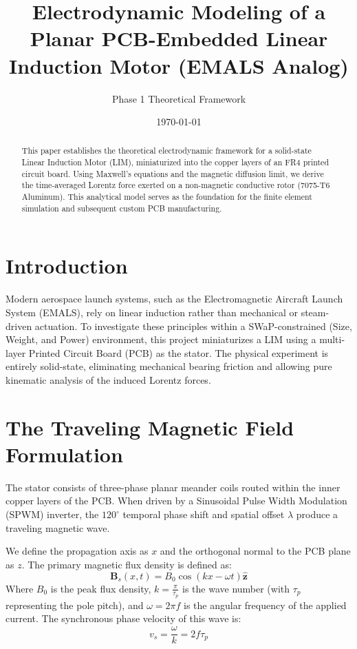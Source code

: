 \documentclass[12pt, a4paper]{article}
\title{\textbf{Electrodynamic Modeling of a Planar PCB-Embedded Linear Induction Motor (EMALS Analog)}}
\author{Phase 1 Theoretical Framework}
\date{\today}
\begin{document}
\maketitle

\begin{abstract}
This paper establishes the theoretical electrodynamic framework for a solid-state Linear Induction Motor (LIM), miniaturized into the copper layers of an FR4 printed circuit board. Using Maxwell's equations and the magnetic diffusion limit, we derive the time-averaged Lorentz force exerted on a non-magnetic conductive rotor (7075-T6 Aluminum). This analytical model serves as the foundation for the finite element simulation and subsequent custom PCB manufacturing.
\end{abstract}

\section{Introduction}
Modern aerospace launch systems, such as the Electromagnetic Aircraft Launch System (EMALS), rely on linear induction rather than mechanical or steam-driven actuation. To investigate these principles within a SWaP-constrained (Size, Weight, and Power) environment, this project miniaturizes a LIM using a multi-layer Printed Circuit Board (PCB) as the stator. The physical experiment is entirely solid-state, eliminating mechanical bearing friction and allowing pure kinematic analysis of the induced Lorentz forces.

\section{The Traveling Magnetic Field Formulation}
The stator consists of three-phase planar meander coils routed within the inner copper layers of the PCB. When driven by a Sinusoidal Pulse Width Modulation (SPWM) inverter, the $120^\circ$ temporal phase shift and spatial offset $\lambda$ produce a traveling magnetic wave.

We define the propagation axis as $x$ and the orthogonal normal to the PCB plane as $z$. The primary magnetic flux density is defined as:
\begin{equation}
    \mathbf{B}_s(x, t) = B_0 \cos(kx - \omega t)\mathbf{\hat{z}}
\end{equation}
Where $B_0$ is the peak flux density, $k = \frac{\pi}{\tau_p}$ is the wave number (with $\tau_p$ representing the pole pitch), and $\omega = 2\pi f$ is the angular frequency of the applied current. The synchronous phase velocity of this wave is:
\begin{equation}
    v_s = \frac{\omega}{k} = 2f\tau_p
\end{equation}
\end{document}
